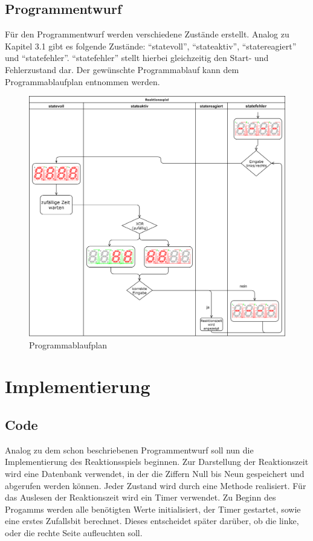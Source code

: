 \documentclass[11pt,ngerman]{report}
\begin{document}
\section{Programmentwurf}

Für den Programmentwurf werden verschiedene Zustände erstellt. Analog zu Kapitel 3.1 gibt es folgende Zustände: “statevoll”, “stateaktiv”, “statereagiert” und “statefehler”. “statefehler” stellt hierbei gleichzeitig den Start- und Fehlerzustand dar. Der gewünschte Programmablauf kann dem Programmablaufplan entnommen werden.

\begin{figure}[h]
	\caption{Programmablaufplan}
	\centering
	\includegraphics[width=\textwidth]{programmablaufdiagramm.png}
\end{figure}


\chapter{Implementierung}

\section{Code}

Analog zu dem schon beschriebenen Programmentwurf soll nun die Implementierung des Reaktionsspiels beginnen. Zur Darstellung der Reaktionszeit wird eine Datenbank verwendet, in der die Ziffern Null bis Neun gespeichert und abgerufen werden können. Jeder Zustand wird durch eine Methode realisiert. Für das Auslesen der Reaktionszeit wird ein Timer verwendet. 
Zu Beginn des Progamms werden alle benötigten Werte initialisiert, der Timer gestartet, sowie eine erstes Zufallsbit berechnet. Dieses entscheidet später darüber, ob die linke, oder die rechte Seite aufleuchten soll.
\end{document}
